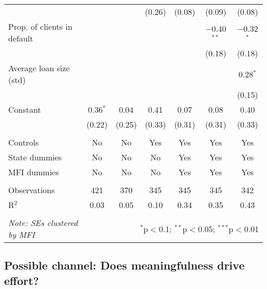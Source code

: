 \documentclass[11pt]{article}
\begin{document}
\begin{table}[!htbp]
\begin{tabular}{@{\extracolsep{5pt}}lcccccc}
  &  &  & (0.26) & (0.08) & (0.09) & (0.08) \\ 
  Prop. of clients in default &  &  &  &  & $-$0.40$^{**}$ & $-$0.32$^{*}$ \\ 
  &  &  &  &  & (0.18) & (0.18) \\ 
  Average loan size (std) &  &  &  &  &  & 0.28$^{*}$ \\ 
  &  &  &  &  &  & (0.15) \\ 
  Constant & 0.36$^{*}$ & 0.04 & 0.41 & 0.07 & 0.08 & 0.40 \\ 
  & (0.22) & (0.25) & (0.33) & (0.31) & (0.31) & (0.33) \\ 
 \hline \\[-1.8ex] 
Controls & No & No & Yes & Yes & Yes & Yes \\ 
State dummies & No & No & No & Yes & Yes & Yes \\ 
MFI dummies & No & No & No & Yes & Yes & Yes \\ 
\hline \\[-1.8ex] 
Observations & 421 & 370 & 345 & 345 & 345 & 342 \\ 
R$^{2}$ & 0.03 & 0.05 & 0.10 & 0.34 & 0.35 & 0.43 \\ 
\hline 
\hline \\[-1.8ex] 
\textit{Note: SEs clustered by MFI}  & \multicolumn{6}{r}{$^{*}$p$<$0.1; $^{**}$p$<$0.05; $^{***}$p$<$0.01} \\ 
\end{tabular} 
\end{table} 

\pagebreak

\subsection{Possible channel: Does meaningfulness drive effort?}
\end{document}
